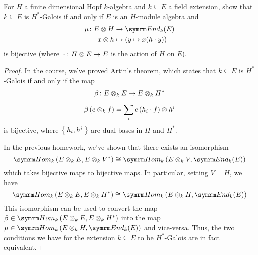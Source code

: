 \begin{exercise}
For \(H\) a finite dimensional Hopf \(k\)-algebra and \(k \subseteq E\) a field extension, show that \(k \subseteq E\) is \(H^*\)-Galois if and only if \(E\) is an \(H\)-module algebra and
\begin{align*}
    \mu \colon E \tensor H &\to \End_k (E) \\
    x \tensor h &\mapsto (y \mapsto x (h \cdot y))
\end{align*}
is bijective (where \(\, \cdot \, \colon H \otimes E \to E\) is the action of \(H\) on \(E\)).
\end{exercise}
\begin{proof}
In the course, we've proved Artin's theorem, which states that \(k \subseteq E\) is \(H^*\)-Galois if and only if the map
\begin{gather*}
    \beta \colon E \otimes_{k} E \to E \otimes_{k} H^* \\[0.5em]
    \beta\left(e \otimes_{k} f\right) = \sum_{i} e \left(h_i \cdot f\right) \otimes h^i
\end{gather*}
is bijective, where \(\Set{ h_i, h^i }\) are dual bases in \(H\) and \(H^*\).

In the previous homework, we've shown that there exists an isomorphism
\[
    \Hom_k \left(E \tensor_k E, E \tensor_k V^*\right) \cong \Hom_k \left(E \tensor_k V, \End_k(E)\right)
\]
which takes bijective maps to bijective maps. In particular, setting \(V = H\), we have
\[
    \Hom_k \left(E \tensor_k E, E \tensor_k H^*\right) \cong \Hom_k \left(E \tensor_k H, \End_k(E)\right)
\]
This isomorphism can be used to convert the map \(\beta \in \Hom_k \left(E \tensor_k E, E \tensor_k H^*\right)\) into the map \(\mu \in \Hom_k \left(E \tensor_k H, \End_k(E)\right)\) and vice-versa. Thus, the two conditions we have for the extension \(k \subseteq E\) to be \(H^*\)-Galois are in fact equivalent.
\end{proof}